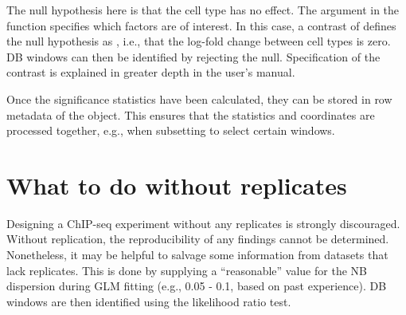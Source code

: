 \documentclass{report}\usepackage[]{graphicx}\usepackage[usenames,dvipsnames]{color}
\newcommand{\hlnum}[1]{\textcolor[rgb]{0.816,0.125,0.439}{#1}}%
\newcommand{\hlopt}[1]{\textcolor[rgb]{0,0,0}{#1}}%
\newcommand{\hlstd}[1]{\textcolor[rgb]{0.251,0.251,0.251}{#1}}%
\newcommand{\hlkwb}[1]{\textcolor[rgb]{0,0,0}{#1}}%
\newcommand{\hlkwc}[1]{\textcolor[rgb]{0.251,0.251,0.251}{#1}}%
\newcommand{\hlkwd}[1]{\textcolor[rgb]{0.878,0.439,0.125}{#1}}%
\newenvironment{knitrout}{}{} %
\begin{document}
\begin{knitrout}
\color{fgcolor}
\end{knitrout}

The null hypothesis here is that the cell type has no effect. 
The  argument in the  function specifies which factors are of interest. 
In this case, a contrast of  defines the null hypothesis as , i.e., that the log-fold change between cell types is zero. 
DB windows can then be identified by rejecting the null. 
Specification of the contrast is explained in greater depth in the  user's manual. 

Once the significance statistics have been calculated, they can be stored in row metadata of the  object.
This ensures that the statistics and coordinates are processed together, e.g., when subsetting to select certain windows.

\begin{knitrout}
\color{fgcolor}
\end{knitrout}

\section{What to do without replicates}
Designing a ChIP-seq experiment without any replicates is strongly discouraged.
Without replication, the reproducibility of any findings cannot be determined. 
Nonetheless, it may be helpful to salvage some information from datasets that lack replicates.
This is done by supplying a ``reasonable'' value for the NB dispersion during GLM fitting (e.g., 0.05 - 0.1, based on past experience).
DB windows are then identified using the likelihood ratio test.
\end{document}
